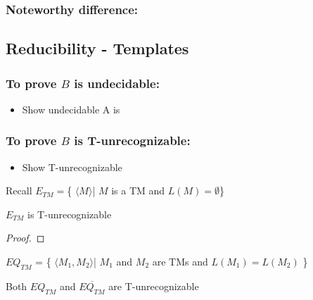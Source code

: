 \subsubsection{Noteworthy difference:} 

\subsection{Reducibility - Templates}

\subsubsection{To prove \(B\) is undecidable:} 
\begin{itemize}
    \item Show undecidable A is 
\end{itemize}

\subsubsection{To prove \(B\) is T-unrecognizable:} 
\begin{itemize}
    \item Show T-unrecognizable
\end{itemize}


\begin{theorem}
    Recall \(E_{TM} = \)\{ \(\langle M \rangle\)| \(M\) is a TM and \(L(M) = \emptyset\)\} 

    \(E_{TM}\) is T-unrecognizable 
\end{theorem}
\begin{proof}
    
\end{proof}


\begin{theorem}
    \(EQ_{TM}\) = \{ \(\langle M_1, M_2 \rangle\)| \(M_1\) and \(M_2\) are TMs and \(L(M_1) = L(M_2)\)  \} 

    Both \(EQ_{TM}\) and \(\overline{EQ_{TM}}\) are T-unrecognizable  
\end{theorem}

\begin{remark}
    
\end{remark}